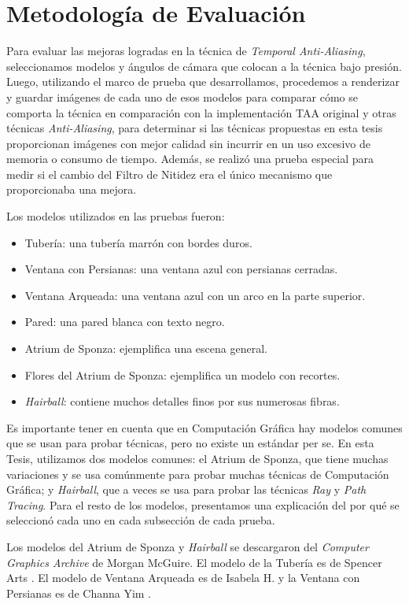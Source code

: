 \documentclass[pregrado]{tesis-usb} %
\begin{document}
\section{Metodología de Evaluación}
Para evaluar las mejoras logradas en la técnica de \textit{Temporal Anti-Aliasing}, seleccionamos modelos y ángulos de cámara que colocan a la técnica bajo presión. Luego, utilizando el marco de prueba que desarrollamos, procedemos a renderizar y guardar imágenes de cada uno de esos modelos para comparar cómo se comporta la técnica en comparación con la implementación TAA original y otras técnicas \textit{Anti-Aliasing}, para determinar si las técnicas propuestas en esta tesis proporcionan imágenes con mejor calidad sin incurrir en un uso excesivo de memoria o consumo de tiempo. Además, se realizó una prueba especial para medir si el cambio del Filtro de Nitidez era el único mecanismo que proporcionaba una mejora.

Los modelos utilizados en las pruebas fueron:
\begin{itemize}
\item Tubería: una tubería marrón con bordes duros.
\item Ventana con Persianas: una ventana azul con persianas cerradas.
\item Ventana Arqueada: una ventana azul con un arco en la parte superior.
\item Pared: una pared blanca con texto negro.
\item Atrium de Sponza: ejemplifica una escena general.
\item Flores del Atrium de Sponza: ejemplifica un modelo con recortes.
\item \textit{Hairball}: contiene muchos detalles finos por sus numerosas fibras.
\end{itemize}

Es importante tener en cuenta que en Computación Gráfica hay modelos comunes que se usan para probar técnicas, pero no existe un estándar per se. En esta Tesis, utilizamos dos modelos comunes: el Atrium de Sponza, que tiene muchas variaciones y se usa comúnmente para probar muchas técnicas de Computación Gráfica; y \textit{Hairball}, que a veces se usa para probar las técnicas \textit{Ray} y \textit{Path Tracing}. Para el resto de los modelos, presentamos una explicación del por qué se seleccionó cada uno en cada subsección de cada prueba.

Los modelos del Atrium de Sponza y \textit{Hairball} se descargaron del \textit{Computer Graphics Archive} \cite{McGuire2017Data} de Morgan McGuire. El modelo de la Tubería es de Spencer Arts \cite{Spencer2010}. El modelo de Ventana Arqueada es de Isabela H. \cite{Isabela2016} y la Ventana con Persianas es de Channa Yim \cite{Channa2015}.
\end{document}
